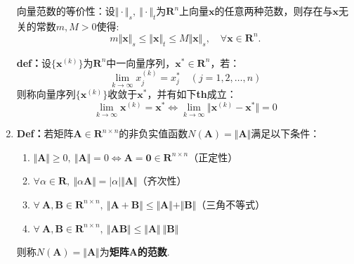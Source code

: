 \begin{enumerate}
    向量范数的等价性：设$\Vert \cdot \Vert_s,\ \Vert \cdot \Vert_t$为$\mathbf{R}^n$上向量$\boldsymbol{x}$的任意两种范数，则存在与$\boldsymbol{x}$无关的常数$m,M>0$使得:
    \begin{equation}
        m\Vert \boldsymbol{x}\Vert_s \leqslant \Vert \boldsymbol{x}\Vert_t \leqslant M\Vert \boldsymbol{x} \Vert_s, \quad \forall \boldsymbol{x} \in \mathbf{R}^n.
    \end{equation}

    \textbf{def：}设$\{ \boldsymbol{x}^{(k)} \}$为$\mathbf{R}^n$中一向量序列，$\boldsymbol{x}^{*} \in \mathbf{R}^n$，若：
    \begin{equation*}
        \lim_{k\rightarrow \infty} x_j^{(k)} = x_j^{*}\quad (j=1,2,\dots,n)
    \end{equation*}
    则称向量序列$\{ \boldsymbol{x}^{(k)} \}$收敛于$\boldsymbol{x}^*$，并有如下\textbf{th}成立：
    \begin{equation*}
        \lim_{k\rightarrow \infty} \boldsymbol{x}^{(k)} = \boldsymbol{x}^\ast \Leftrightarrow \lim_{k\rightarrow \infty} \Vert \boldsymbol{x}^{(k)} - \boldsymbol{x}^\ast \Vert = 0
    \end{equation*}


    \newpage
    \item \textbf{Def：}若矩阵$\boldsymbol{A} \in \mathbf{R}^{n\times n}$的非负实值函数$N(\boldsymbol{A}) = \Vert \boldsymbol{A} \Vert$满足以下条件：
    \begin{enumerate}
        \item $\Vert \boldsymbol{A} \Vert \geqslant 0,\ \Vert \boldsymbol{A} \Vert = 0 \Leftrightarrow \boldsymbol{A}=\boldsymbol{0} \in \mathbf{R}^{n\times n}$（正定性）
        \item $\forall \alpha \in \mathbf{R},\ \Vert \alpha \boldsymbol{A} \Vert = \vert \alpha \vert \Vert \boldsymbol{A} \Vert$（齐次性）
        \item $\forall\ \boldsymbol{A}, \boldsymbol{B} \in \mathbf{R}^{n \times n},\ \Vert \boldsymbol{A}+\boldsymbol{B} \Vert \leqslant \Vert \boldsymbol{A} \Vert + \Vert \boldsymbol{B} \Vert$（三角不等式）
        \item $\forall\ \boldsymbol{A}, \boldsymbol{B} \in \mathbf{R}^{n \times n},\ \Vert \boldsymbol{AB} \Vert \leqslant \Vert \boldsymbol{A} \Vert \ \Vert \boldsymbol{B} \Vert$
    \end{enumerate}
    则称$N(\boldsymbol{A}) = \Vert \boldsymbol{A} \Vert$为\textbf{矩阵$\boldsymbol{A}$的范数}.


\end{enumerate}
